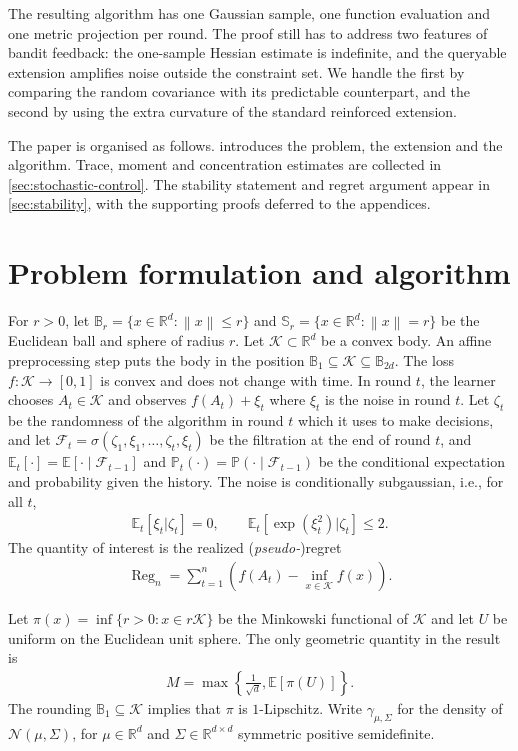 \documentclass[11pt]{article}
\newcommand{\R}{\mathbb R}
\newcommand{\E}{\mathbb E}
\newcommand{\Pp}{\mathbb P}
\newcommand{\K}{\mathcal K}
\newcommand{\F}{\mathcal F}
\newcommand{\N}{\mathcal N}
\newcommand{\1}{\mathbf 1}
\newcommand{\norm}[1]{\left\lVert #1\right\rVert}
\begin{document}
The resulting algorithm has one Gaussian sample, one function evaluation and
one metric projection per round.
The proof still has to address two features of bandit feedback:
the one-sample Hessian estimate is indefinite, and the queryable extension
amplifies noise outside the constraint set.
We handle the first by comparing the random covariance with its
predictable counterpart, and the second by using the extra curvature of the
standard reinforced extension.

The paper is organised as follows.   introduces the problem,
the extension and the algorithm.
Trace, moment and concentration estimates
are collected in \cref{sec:stochastic-control}.  The stability statement and
regret argument appear in \cref{sec:stability}, with the supporting proofs
deferred to the appendices.

\section{Problem formulation and algorithm}
\label{sec:setting}

For $r>0$, let $\mathbb{B}_r=\{x\in\R^d:\norm{x}\leq r\}$
and $\mathbb{S}_r=\{x\in\R^d:\norm{x}=r\}$ be the Euclidean ball and sphere of radius $r$.
Let $\K\subset\R^d$ be a convex body.  An affine preprocessing step puts the body
in the position $\mathbb{B}_1\subseteq\K\subseteq \mathbb{B}_{2d}$.
The loss $f:\K\to[0,1]$ is convex and does not change with time.  In round
$t$, the learner chooses $A_t\in\K$ and observes $f(A_t)+\xi_t$
where $\xi_t$ is the noise in round $t$.
Let $\zeta_t$ be the randomness of the algorithm in round $t$ which it uses to make decisions, and let
$\F_t=\sigma(\zeta_1,\xi_1,\ldots,\zeta_t,\xi_t)$ be the filtration at the end of round $t$,
and $\E_t[\cdot]=\E[\cdot\mid\F_{t-1}]$ and $\Pp_t(\cdot)=\Pp(\cdot\mid\F_{t-1})$ be the conditional expectation and probability given the history.
The noise is conditionally subgaussian, i.e., for all $t$,
\begin{align}
    \E_t[\xi_t|\zeta_t]=0,
    \qquad
    \E_t[\exp(\xi_t^2)|\zeta_t]\leq2.
    \label{eq:noise}
\end{align}
The quantity of interest is the realized (\textit{pseudo-})regret
\begin{align}
    \operatorname{Reg}_n
    =\sum_{t=1}^n\left(f(A_t)-\inf_{x\in\K}f(x)\right).
    \label{eq:regret}
\end{align}

Let $\pi(x)=\inf\{r>0:x\in r\K\}$ be the Minkowski functional of $\K$ and let
$U$ be uniform on the Euclidean unit sphere.
The only geometric quantity in the result is
\begin{align}
    M=\max\left\{\frac1{\sqrt d},\E[\pi(U)]\right\}.
    \label{eq:M}
\end{align}
The rounding  $\mathbb{B}_1\subseteq\K$ implies that $\pi$ is $1$-Lipschitz.
Write $\gamma_{\mu,\Sigma}$ for the density of
$\N(\mu,\Sigma)$, for $\mu\in\R^d$ and $\Sigma\in\R^{d\times d}$ symmetric positive semidefinite.
\end{document}
